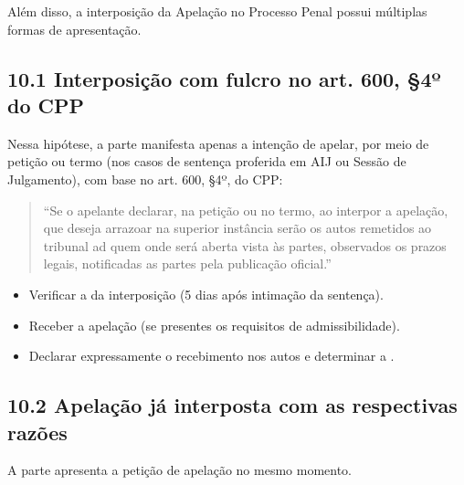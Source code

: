 \documentclass[letterpaper,10pt,brazil]{sphinxmanual}
\begin{document}
\sphinxAtStartPar
Além disso, a interposição da Apelação no Processo Penal possui múltiplas formas de apresentação.


\subsection{10.1 \textendash{} Interposição com fulcro no art. 600, \S{}4º do CPP}
\label{\detokenize{11decisao_recebimento_apelacao:interposicao-com-fulcro-no-art-600-4o-do-cpp}}
\sphinxAtStartPar
Nessa hipótese, a parte manifesta apenas a intenção de apelar, por meio de petição ou termo (nos casos de sentença proferida em AIJ ou Sessão de Julgamento), com base no art. 600, \S{}4º, do CPP:
\begin{quote}

\sphinxAtStartPar
“Se o apelante declarar, na petição ou no termo, ao interpor a apelação, que deseja arrazoar na superior instância serão os autos remetidos ao tribunal ad quem onde será aberta vista às partes, observados os prazos legais, notificadas as partes pela publicação oficial.”
\end{quote}

\sphinxAtStartPar
{}
\begin{itemize}
\item {} 
\sphinxAtStartPar
Verificar a  da interposição (5 dias após intimação da sentença).

\item {} 
\sphinxAtStartPar
Receber a apelação (se presentes os requisitos de admissibilidade).

\item {} 
\sphinxAtStartPar
Declarar expressamente o recebimento nos autos e determinar a .

\end{itemize}


\subsection{10.2 \textendash{} Apelação já interposta com as respectivas razões}
\label{\detokenize{11decisao_recebimento_apelacao:apelacao-ja-interposta-com-as-respectivas-razoes}}
\sphinxAtStartPar
A parte apresenta a petição de apelação  no mesmo momento.
\end{document}

